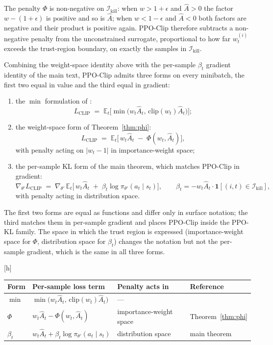 \documentclass{article}
\makeatletter
\newcommand{\indicator}{\mathbf{1}}
\renewenvironment{table}
  {\setlength{\abovecaptionskip}{8\p@}%
   \setlength{\belowcaptionskip}{\z@}%
   \@float{table}}
  {\end@float}
\makeatother
\begin{document}
The penalty $\Phi$ is non-negative on $\mathcal{I}_{\mathrm{kill}}$:
when $w > 1+\epsilon$ and $\hat{A} > 0$ the factor $w - (1+\epsilon)$
is positive and so is $\hat{A}$; when $w < 1-\epsilon$ and $\hat{A} <
0$ both factors are negative and their product is positive again.
PPO-Clip therefore subtracts a non-negative penalty from the
unconstrained surrogate, proportional to how far $w_t^{(i)}$ exceeds
the trust-region boundary, on exactly the samples in
$\mathcal{I}_{\mathrm{kill}}$.

Combining the weight-space identity above with the per-sample
$\beta_t$ gradient identity of the main text, PPO-Clip admits three
forms on every minibatch, the first two equal in value and the third
equal in gradient:
\begin{enumerate}
\item the $\min$ formulation of \citet{schulman2017ppo}:
\[
L_{\mathrm{CLIP}} \;=\; \mathbb{E}_t\!\bigl[\min\!\bigl(w_t \hat{A}_t,\, \mathrm{clip}(w_t)\hat{A}_t\bigr)\bigr];
\]
\item the weight-space form of Theorem~\ref{thm:phi}:
\[
L_{\mathrm{CLIP}} \;=\; \mathbb{E}_t\!\bigl[\,w_t \hat{A}_t \;-\; \Phi(w_t, \hat{A}_t)\bigr],
\]
with penalty acting on $|w_t - 1|$ in importance-weight space;
\item the per-sample KL form of the main theorem, which matches
PPO-Clip in gradient:
\[
\nabla_{\theta'} L_{\mathrm{CLIP}} \;=\; \nabla_{\theta'}\,\mathbb{E}_t\!\bigl[\,w_t \hat{A}_t \;+\; \beta_t \log \pi_{\theta'}(a_t \mid s_t)\bigr],
\qquad \beta_t = -w_t \hat{A}_t \cdot \indicator\!\left[(i,t) \in \mathcal{I}_{\mathrm{kill}}\right],
\]
with penalty acting in distribution space.
\end{enumerate}
The first two forms are equal as functions and differ only in surface
notation; the third matches them in per-sample gradient and places
PPO-Clip inside the PPO-KL family. The space in which the
trust region is expressed (importance-weight space for $\Phi$,
distribution space for $\beta_t$) changes the notation but not the
per-sample gradient, which is the same in all three forms.

\begin{table}[h]
\centering
\small
\renewcommand{\arraystretch}{1.5}
\begin{tabular}{@{} l l l l @{}}
\toprule
\textbf{Form} & \textbf{Per-sample loss term} & \textbf{Penalty acts in} & \textbf{Reference} \\
\midrule
$\min$ & $\min\!\bigl(w_t\hat{A}_t,\, \mathrm{clip}(w_t)\hat{A}_t\bigr)$ & --- & \cite{schulman2017ppo} \\
$\Phi$ & $w_t\hat{A}_t - \Phi(w_t, \hat{A}_t)$ & importance-weight space & Theorem~\ref{thm:phi} \\
$\beta_t$ & $w_t\hat{A}_t + \beta_t \log\pi_{\theta'}(a_t \mid s_t)$ & distribution space & main theorem \\
\bottomrule
\end{tabular}
\caption{Three forms of the PPO-Clip per-sample loss. All three produce the same per-sample gradient on every $(i, t)$.}
\label{tab:three-forms}
\end{table}
\end{document}
